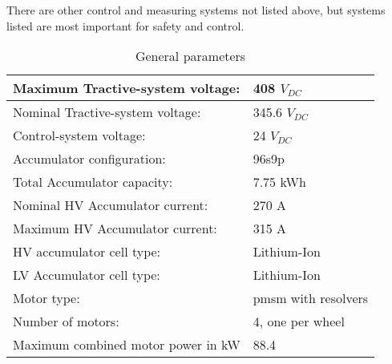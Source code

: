There are other control and measuring systems not listed above, but systems listed are most important for safety and control.


\begin{table}[H]
	\centering
	\caption{General parameters}
	\begin{tabu}{|X|X|}
		\hline
		Maximum Tractive-system voltage: & 408 $V_{DC}$  \\
		\hline Nominal Tractive-system voltage: & 345.6 $V_{DC}$\\
		\hline
		Control-system voltage: & 24 $V_{DC}$ \\
		\hline
		Accumulator configuration: & 96s9p \\
		\hline
		Total Accumulator capacity: & 7.75 kWh\\
		\hline
		Nominal HV Accumulator current: & 270 A \\
		\hline
		Maximum HV Accumulator current: & 315 A \\
		\hline
		HV accumulator cell type: & Lithium-Ion  \\
		\hline
		LV Accumulator cell type: & Lithium-Ion \\
		\hline
		Motor type: & \gls{pmsm} with resolvers \\
		\hline
		Number of motors: &  4, one per wheel \\
		\hline
		Maximum combined motor power in kW & 88.4 \\
		\hline
	\end{tabu}%
	\label{tab:system-general}%
\end{table}%

